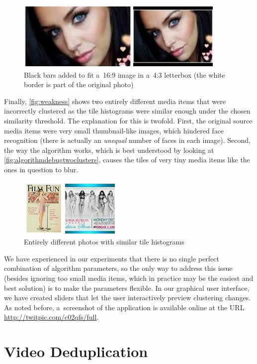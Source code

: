 \begin{figure}[!ht]
  \centering
  \includegraphics[width=0.55\linewidth]{./bwtolerance.png}
  \caption[Black bars added to fit a~16:9 image in a~4:3 letterbox]
    {Black bars added to fit a~16:9 image in a~4:3 letterbox
    (the white border is part of the original photo)}
  \label{fig:bwtolerance}
\end{figure}

Finally, \autoref{fig:weakness} shows two entirely different media items
that were incorrectly clustered as the tile histograms
were similar enough under the chosen similarity threshold.
The explanation for this is twofold.
First, the original source media items were very small thumbnail-like images,
which hindered face recognition
(there is actually an \emph{unequal} number of faces in each image).
Second, the way the algorithm works,
which is best understood by looking at \autoref{fig:algorithmdebugtwoclusters},
causes the tiles of very tiny media items like the ones in question to blur.

\begin{figure}[!ht]
  \centering
  \includegraphics[width=0.4\linewidth]{./weakness.png}
  \caption{Entirely different photos with similar tile histograms}
  \label{fig:weakness}
\end{figure}

We have experienced in our experiments that there is no single perfect
combination of algorithm parameters,
so the only way to address this issue (besides ignoring too small media items,
which in practice may be the easiest and best solution)
is to make the parameters flexible.
In our graphical user interface, we have created sliders
that let the user interactively preview clustering changes.
As noted before, a~screenshot of the application
is available online at the URL \url{http://twitpic.com/c02qfs/full}.

\section{Video Deduplication}

